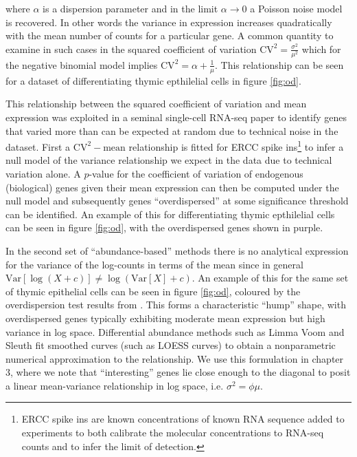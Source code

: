 where $\alpha$ is a dispersion parameter and in the limit $\alpha \rightarrow 0$ a Poisson noise model is recovered. In other words the variance in expression increases quadratically with the mean number of counts for a particular gene. A common quantity to examine in such cases in the squared coefficient of variation $\text{CV}^2 = \frac{\sigma^2}{\mu^2}$ which for the negative binomial model implies $\text{CV}^2 = \alpha + \frac{1}{\mu}$. This relationship can be seen for a dataset of differentiating thymic epthilelial cells in figure \ref{fig:od}.

This relationship between the squared coefficient of variation and mean expression was exploited in a seminal single-cell RNA-seq paper \cite{Brennecke2013-xy} to identify genes that varied more than can be expected at random due to technical noise in the dataset. First a $\text{CV}^2-\text{mean}$ relationship is fitted for ERCC spike ins\footnote{
ERCC spike ins are known concentrations of known RNA sequence added to experiments to both calibrate the molecular concentrations to RNA-seq counts and to infer the limit of detection.
} to infer a null model of the variance relationship we expect in the data due to technical variation alone. A $p$-value for the coefficient of variation of endogenous (biological) genes given their mean expression can then be computed under the null model and subsequently genes ``overdispersed'' at some significance threshold can be identified. An example of this for differentiating thymic epthilelial cells can be seen in figure \ref{fig:od}, with the overdispersed genes shown in purple.

In the second set of ``abundance-based'' methods there is no analytical expression for the variance of the log-counts in terms of the mean since in general $\text{Var}[\log(X + c)] \neq \log(\text{Var}[X] + c)$. An example of this for the same set of thymic epithelial cells can be seen in figure \ref{fig:od}, coloured by the overdispersion test results from \cite{Brennecke2013-xy}. This forms a characteristic ``hump'' shape, with overdispersed genes typically exhibiting moderate mean expression but high variance in log space. Differential abundance methods such as Limma Voom and Sleuth fit smoothed curves (such as LOESS curves) to obtain a nonparametric numerical approximation to the relationship. We use this formulation in chapter 3, where we note that ``interesting'' genes lie close enough to the diagonal to posit a linear mean-variance relationship in log space, i.e. $\sigma^2 = \phi \mu$.

